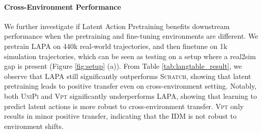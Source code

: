 \documentclass{article} %
\begin{document}
\paragraph{Cross-Environment Performance}
We further investigate if Latent Action Pretraining benefits downstream performance when the pretraining and fine-tuning environments are different. We pretrain LAPA on 440k real-world trajectories, and then finetune on 1k simulation trajectories, which can be seen as testing on a setup where a real2sim gap is present (Figure \ref{fig:setup} (a)).
From Table \ref{tab:langtable_result}, we observe that LAPA still significantly outperforms \textsc{Scratch}, showing that latent pretraining leads to positive transfer even on cross-environment setting. Notably, both \textsc{UniPi} and \textsc{Vpt} significantly underperforms LAPA, showing that learning to predict latent actions is more robust to cross-environment transfer. \textsc{Vpt} only results in minor positive transfer, indicating that the IDM is not robust to environment shifts.



\end{document}
